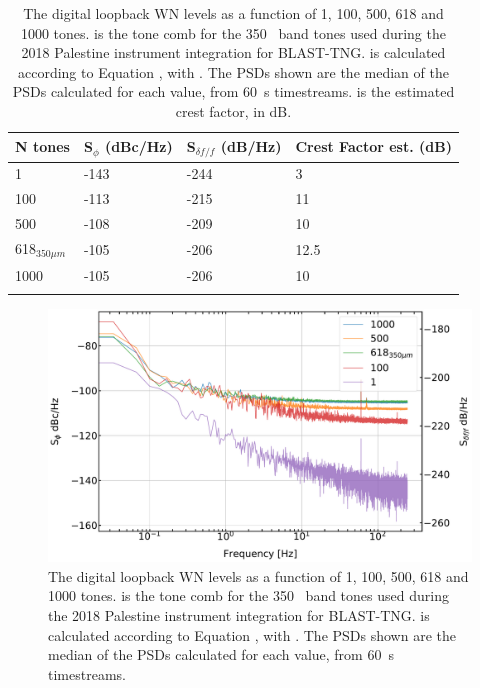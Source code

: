 \begin{table}[!htbp]
\centering
\begin{tabular}{@{}llll@{}}
  \dtoprule
  N tones & S$_{\phi}$ (dBc/Hz) & S$_{\delta f / f}$ (dB/Hz) & Crest Factor est. (dB) \\ \midrule
  1 & -143 & -244 & 3 \\
  100 & -113 & -215 & 11 \\
  500 & -108 & -209 & 10 \\
  618$_{350\mu m}$ & -105 & -206 & 12.5 \\
  1000 & -105 & -206 & 10 \\ \dbottomrule
  \\
\end{tabular}
\caption[~Digital loopback noise levels as a function of number of probe tones.]{The digital loopback WN levels as a function of 1, 100, 500, 618 and 1000 tones.  is the tone comb for the 350~ band tones used during the 2018 Palestine instrument integration for BLAST-TNG.  is calculated according to Equation \macrocapwrap{\ref{eq:Sff est}}, with . The PSDs shown are the median of the PSDs calculated for each  value, from 60~s timestreams.  is the estimated crest factor, in dB.}
\label{tab:dig loopback}
\end{table}

\begin{figure}[!htbp]
\centering
\includegraphics[width=\textwidth]{figures/readout/sim/LB_noise}
\caption[~Digital loopback WN levels as a function of 1, 100, 500, 618 and 1000 tones.]{The digital loopback WN levels as a function of 1, 100, 500, 618 and 1000 tones.  is the tone comb for the 350~ band tones used during the 2018 Palestine instrument integration for BLAST-TNG.  is calculated according to Equation \macrocapwrap{\ref{eq:Sff est}}, with . The PSDs shown are the median of the PSDs calculated for each  value, from 60~s timestreams.}
\label{fig:dig loopback noise}
\end{figure}

